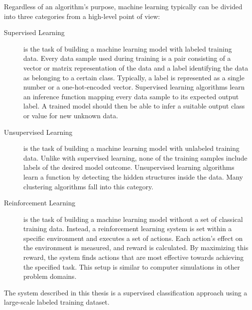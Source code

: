 Regardless of an algorithm's purpose, machine learning typically can be divided into three categories from a high-level point of view:

	\begin{description}
		\item[Supervised Learning] is the task of building a machine learning model with labeled training data. Every data sample used during training is a pair consisting of a vector or matrix representation of the data and a label identifying the data as belonging to a certain class. Typically, a label is represented as a single number or a one-hot-encoded vector. Supervised learning algorithms learn an inference function mapping every data sample to its expected output label. A trained model should then be able to infer a suitable output class or value for new unknown data.

		\item[Unsupervised Learning] is the task of building a machine learning model with unlabeled training data. Unlike with supervised learning, none of the training samples include labels of the desired model outcome. Unsupervised learning algorithms learn a function by detecting the hidden structures inside the data. Many clustering algorithms fall into this category.

		\item[Reinforcement Learning] is the task of building a machine learning model without a set of classical training data. Instead, a reinforcement learning system is set within a specific environment and executes a set of actions. Each action's effect on the environment is measured, and reward is calculated. By maximizing this reward, the system finds actions that are most effective towards achieving the specified task. This setup is similar to computer simulations in other problem domains.
	\end{description}

The system described in this thesis is a supervised classification approach using a large-scale labeled training dataset.

